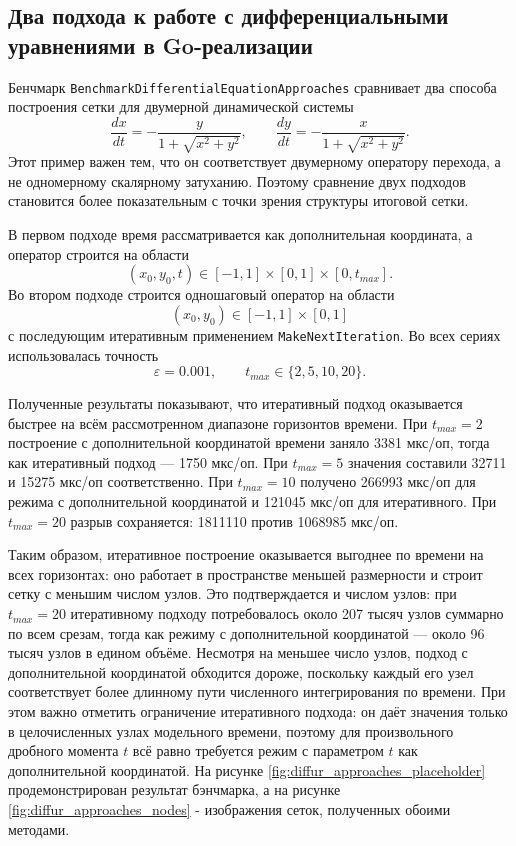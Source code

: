 \subsection{Два подхода к работе с дифференциальными уравнениями в Go-реализации}

Бенчмарк \texttt{BenchmarkDifferentialEquationApproaches} сравнивает два способа построения сетки для двумерной динамической системы
\begin{equation}
    \frac{dx}{dt} = -\frac{y}{1 + \sqrt{x^2+y^2}}, \qquad
    \frac{dy}{dt} = -\frac{x}{1 + \sqrt{x^2+y^2}}.
\end{equation}
Этот пример важен тем, что он соответствует двумерному оператору перехода, а не одномерному скалярному затуханию. Поэтому сравнение двух подходов становится более показательным с точки зрения структуры итоговой сетки.

В первом подходе время рассматривается как дополнительная координата, а оператор строится на области
\begin{equation}
    (x_0, y_0, t) \in [-1, 1] \times [0, 1] \times [0, t_{max}].
\end{equation}
Во втором подходе строится одношаговый оператор на области
\begin{equation}
    (x_0, y_0) \in [-1, 1] \times [0, 1]
\end{equation}
с последующим итеративным применением \texttt{MakeNextIteration}. Во всех сериях использовалась точность
\begin{equation}
    \varepsilon = 0.001, \qquad t_{max} \in \{2, 5, 10, 20\}.
\end{equation}

Полученные результаты показывают, что итеративный подход оказывается быстрее на всём рассмотренном диапазоне горизонтов времени. При $t_{max}=2$ построение с дополнительной координатой времени заняло 3381 мкс/оп, тогда как итеративный подход --- 1750 мкс/оп. При $t_{max}=5$ значения составили 32711 и 15275 мкс/оп соответственно. При $t_{max}=10$ получено 266993 мкс/оп для режима с дополнительной координатой и 121045 мкс/оп для итеративного. При $t_{max}=20$ разрыв сохраняется: 1811110 против 1068985 мкс/оп.

Таким образом, итеративное построение оказывается выгоднее по времени на всех горизонтах: оно работает в пространстве меньшей размерности и строит сетку с меньшим числом узлов. Это подтверждается и числом узлов: при $t_{max}=20$ итеративному подходу потребовалось около 207 тысяч узлов суммарно по всем срезам, тогда как режиму с дополнительной координатой --- около 96 тысяч узлов в едином объёме. Несмотря на меньшее число узлов, подход с дополнительной координатой обходится дороже, поскольку каждый его узел соответствует более длинному пути численного интегрирования по времени. При этом важно отметить ограничение итеративного подхода: он даёт значения только в целочисленных узлах модельного времени, поэтому для произвольного дробного момента $t$ всё равно требуется режим с параметром $t$ как дополнительной координатой.
На рисунке \ref{fig:diffur_approaches_placeholder} продемонстрирован результат бэнчмарка, а на рисунке \ref{fig:diffur_approaches_nodes} - изображения сеток, полученных обоими методами.

